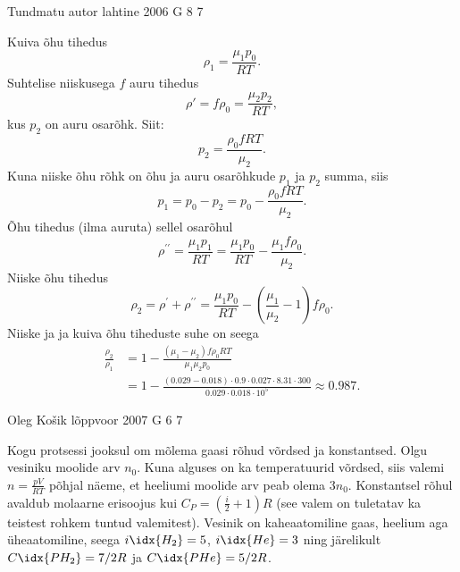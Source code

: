 \documentclass[11pt, twoside]{article}
\begin{document}
{%
{Tundmatu autor} %
{lahtine} %
{2006} %
{G 8} %
{7} %
{

\ifSolution
Kuiva õhu tihedus
\[
\rho_1 = \frac{\mu_1p_0}{RT}.
\]
Suhtelise niiskusega $f$ auru tihedus
\[
\rho' = f \rho_0 = \frac{\mu_2p_2}{RT},
\]
kus $p_2$ on auru osarõhk. Siit:
\[
p_2 = \frac{\rho_0fRT}{\mu_2}.
\]
Kuna niiske õhu rõhk on õhu ja auru osarõhkude $p_1$ ja $p_2$ summa, siis
\[
p_1 = p_0 - p_2 = p_0 - \frac{\rho_0fRT}{\mu_2}.
\]
Õhu tihedus (ilma auruta) sellel osarõhul
\[
\rho^{\prime \prime}=\frac{\mu_{1} p_{1}}{R T}=\frac{\mu_{1} p_{0}}{R T}-\frac{\mu_{1} f \rho_{0}}{\mu_{2}}.
\]
Niiske õhu tihedus
\[
\rho_{2}=\rho^{\prime}+\rho^{\prime \prime}=\frac{\mu_{1} p_{0}}{R T}-\left(\frac{\mu_{1}}{\mu_{2}}-1\right) f \rho_{0}.
\]
Niiske ja ja kuiva õhu tiheduste suhe on seega
\[
\begin{aligned}
\frac{\rho_{2}}{\rho_{1}}&=1-\frac{\left(\mu_{1}-\mu_{2}\right) f \rho_{0} R T}{\mu_{1} \mu_{2} p_{0}} \\ 
&=1-\frac{(\num{0,029}-\num{0,018}) \cdot \num{0,9} \cdot \num{0,027} \cdot \num{8,31} \cdot 300}{\num{0,029} \cdot \num{0,018} \cdot 10^{5}} \approx \num{0,987}.
\end{aligned}
\]
\fi
}

{Oleg Košik} %
{lõppvoor} %
{2007} %
{G 6} %
{7} %
{

\ifSolution
Kogu protsessi jooksul om mõlema gaasi rõhud võrdsed ja konstantsed. Olgu vesiniku moolide arv $n_0$. Kuna alguses on ka temperatuurid võrdsed, siis valemi $n = \frac{pV}{RT}$ põhjal näeme, et heeliumi moolide arv peab olema $3n_0$. Konstantsel rõhul avaldub molaarne erisoojus kui $C_P = \left(\frac{i}{2} + 1\right) R$ (see valem on tuletatav ka teistest rohkem tuntud valemitest). Vesinik on kaheaatomiline gaas, heelium aga üheaatomiline, seega $i\idx{H_2} = 5$, $i\idx{He} = 3$ ning järelikult $C\idx{PH_2} = 7/2R$ ja $C\idx{PHe} = 5/2R$.

}}
\end{document}
